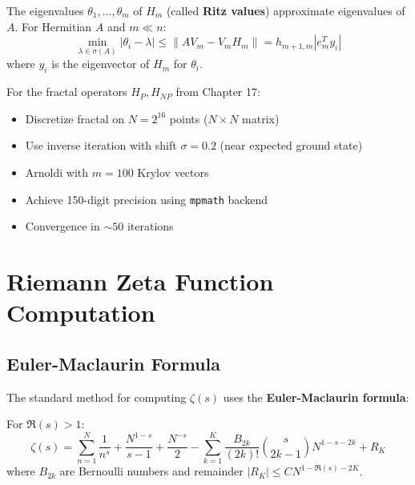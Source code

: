 \begin{thm}\label{thm:ritz}
The eigenvalues $\theta_1, \ldots, \theta_m$ of $H_m$ (called \textbf{Ritz values}) approximate eigenvalues of $A$. For Hermitian $A$ and $m \ll n$:
\begin{equation}
\min_{\lambda \in \sigma(A)} |\theta_i - \lambda| \leq \|A V_m - V_m H_m\| = h_{m+1,m} |e_m^T y_i|
\end{equation}
where $y_i$ is the eigenvector of $H_m$ for $\theta_i$.
\end{thm}

\begin{remark}
For the fractal operators $H_P, H_{NP}$ from Chapter 17:
\begin{itemize}
\item Discretize fractal on $N = 2^{16}$ points ($N \times N$ matrix)
\item Use inverse iteration with shift $\sigma = 0.2$ (near expected ground state)
\item Arnoldi with $m = 100$ Krylov vectors
\item Achieve 150-digit precision using \texttt{mpmath} backend
\item Convergence in $\sim 50$ iterations
\end{itemize}
\end{remark}

\section{Riemann Zeta Function Computation}
\label{sec:zeta-computation}

\subsection{Euler-Maclaurin Formula}

The standard method for computing $\zeta(s)$ uses the \textbf{Euler-Maclaurin formula}:

\begin{thm}\label{thm:euler-maclaurin-zeta}
For $\Re(s) > 1$:
\begin{equation}
\zeta(s) = \sum_{n=1}^{N} \frac{1}{n^s} + \frac{N^{1-s}}{s-1} + \frac{N^{-s}}{2} - \sum_{k=1}^{K} \frac{B_{2k}}{(2k)!} \binom{s}{2k-1} N^{1-s-2k} + R_K
\end{equation}
where $B_{2k}$ are Bernoulli numbers and remainder $|R_K| \leq C N^{1-\Re(s)-2K}$.
\end{thm}

